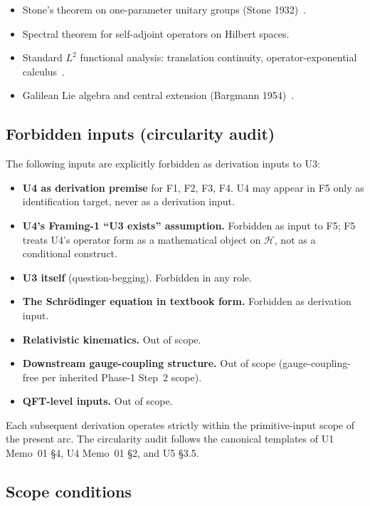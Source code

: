 \documentclass[11pt,a4paper]{article}
\begin{document}
\begin{itemize}
  \item Stone's theorem on one-parameter unitary groups (Stone 1932)~\cite{stone}.
  \item Spectral theorem for self-adjoint operators on Hilbert spaces.
  \item Standard $L^2$ functional analysis: translation continuity, operator-exponential calculus~\cite{reedsimon}.
  \item Galilean Lie algebra and central extension (Bargmann 1954)~\cite{bargmann}.
\end{itemize}

\subsection{Forbidden inputs (circularity audit)}\label{sec:forbidden}

The following inputs are explicitly forbidden as derivation inputs to U3:

\begin{itemize}
  \item \textbf{U4 as derivation premise} for F1, F2, F3, F4. U4 may appear in F5 only as identification target, never as a derivation input.
  \item \textbf{U4's Framing-1 ``U3 exists'' assumption.} Forbidden as input to F5; F5 treats U4's operator form as a mathematical object on $\mathcal{H}$, not as a conditional construct.
  \item \textbf{U3 itself} (question-begging). Forbidden in any role.
  \item \textbf{The Schr\"odinger equation in textbook form.} Forbidden as derivation input.
  \item \textbf{Relativistic kinematics.} Out of scope.
  \item \textbf{Downstream gauge-coupling structure.} Out of scope (gauge-coupling-free per inherited Phase-1 Step~2 scope).
  \item \textbf{QFT-level inputs.} Out of scope.
\end{itemize}

Each subsequent derivation operates strictly within the primitive-input scope of the present arc. The circularity audit follows the canonical templates of U1 Memo~01 \S4, U4 Memo~01 \S2, and U5 \S3.5.

\subsection{Scope conditions}
\end{document}
